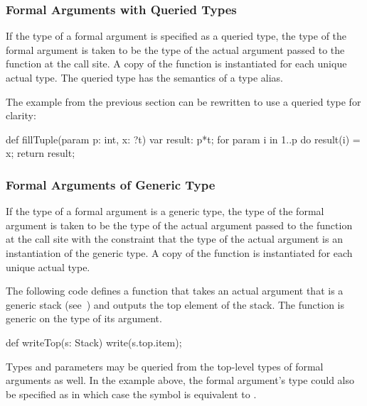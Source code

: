 \subsubsection{Formal Arguments with Queried Types}
\label{Formal_Arguments_with_Queried_Types}

If the type of a formal argument is specified as a queried type, the
type of the formal argument is taken to be the type of the actual
argument passed to the function at the call site.  A copy of the
function is instantiated for each unique actual type.  The queried
type has the semantics of a type alias.
\begin{example}
The example from the previous section can be rewritten to use a
queried type for clarity:
\begin{chapel}
def fillTuple(param p: int, x: ?t) {
  var result: p*t;
  for param i in 1..p do
    result(i) = x;
  return result;
}
\end{chapel}
\end{example}

\subsubsection{Formal Arguments of Generic Type}
\label{Formal_Arguments_of_Generic_Type}

If the type of a formal argument is a generic type, the type of the
formal argument is taken to be the type of the actual argument passed
to the function at the call site with the constraint that the type of
the actual argument is an instantiation of the generic type.  A copy
of the function is instantiated for each unique actual type.
\begin{example}
The following code defines a function  that takes an
actual argument that is a generic stack
(see~) and outputs the top element of the
stack.  The function is generic on the type of its argument.
\begin{chapel}
def writeTop(s: Stack) {
  write(s.top.item);
}
\end{chapel}
\end{example}

Types and parameters may be queried from the top-level types of formal
arguments as well.  In the example above, the formal argument's type
could also be specified as  in which case the
symbol  is equivalent to .

